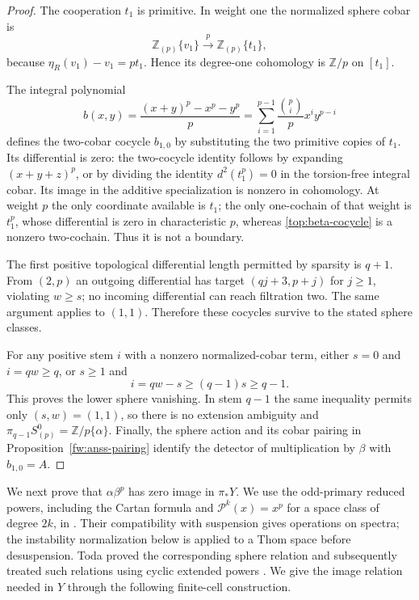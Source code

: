 \begin{proof}
The cooperation $t_1$ is primitive. In weight one the normalized
sphere cobar is
\[
 \mathbb Z_{(p)}\{v_1\}\xrightarrow{\ p\ }
 \mathbb Z_{(p)}\{t_1\},
\]
because $\eta_R(v_1)-v_1=pt_1$. Hence its degree-one cohomology is
$\mathbb Z/p$ on $[t_1]$.

The integral polynomial
\begin{equation}
\label{top:beta-cocycle}
 b(x,y)=\frac{(x+y)^p-x^p-y^p}{p}
 =\sum_{i=1}^{p-1}\frac{\binom pi}{p}x^iy^{p-i}
\end{equation}
defines the two-cobar cocycle $b_{1,0}$ by substituting the two
primitive copies of $t_1$. Its differential is zero: the
two-cocycle identity follows by expanding $(x+y+z)^p$, or by
dividing the identity $d^2(t_1^p)=0$ in the torsion-free integral
cobar. Its image in the additive specialization is nonzero in
cohomology. At weight $p$ the only coordinate available is $t_1$;
the only one-cochain of that weight is $t_1^p$, whose differential
is zero in characteristic $p$, whereas \eqref{top:beta-cocycle}
is a nonzero two-cochain. Thus it is not a boundary.

The first positive topological differential length permitted by
sparsity is $q+1$. From $(2,p)$ an outgoing differential has target
$(qj+3,p+j)$ for $j\geq1$, violating $w\geq s$; no incoming
differential can reach filtration two. The same argument applies
to $(1,1)$. Therefore these cocycles survive to the stated sphere
classes.

For any positive stem $i$ with a nonzero normalized-cobar term,
either $s=0$ and $i=qw\geq q$, or $s\geq1$ and
\[
 i=qw-s\geq(q-1)s\geq q-1.
\]
This proves the lower sphere vanishing. In stem $q-1$ the same
inequality permits only $(s,w)=(1,1)$, so there is no extension
ambiguity and $\pi_{q-1}S^0_{(p)}=\mathbb Z/p\{\alpha\}$.
Finally, the sphere action and its cobar pairing in
Proposition~\ref{fw:anss-pairing} identify the detector of
multiplication by $\beta$ with $b_{1,0}=A$.
\end{proof}

We next prove that $\alpha\beta^p$ has zero image in $\pi_*Y$. We use
the odd-primary reduced powers, including the Cartan formula and
$\mathcal P^k(x)=x^p$ for a space class of degree $2k$, in
\citet[Chapter~VI, Section~1, and Chapter~VIII, Theorem~2.2]{SteenrodEpstein1962}.
Their compatibility with suspension gives operations on spectra; the
instability normalization below is applied to a Thom space before
desuspension. Toda proved the corresponding sphere relation
\citep[p.~839, Corollary]{Toda1967} and subsequently treated such
relations using cyclic extended powers
\citep[Sections~1--3, especially Theorem~3]{Toda1968}.
We give the image relation needed in $Y$ through the following
finite-cell construction.

